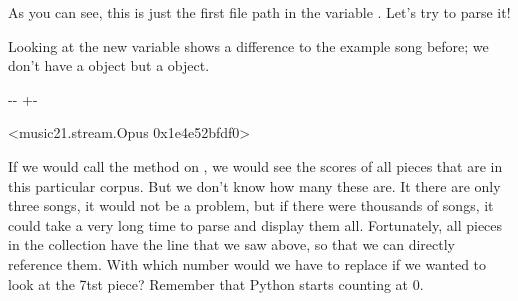 \documentclass[letterpaper,10pt,english]{sphinxmanual}
\newlength\nbsphinxcodecellspacing
\begin{document}
As you can see, this is just the first file path in the variable . Let’s try to parse it!

{
\begin{sphinxVerbatim}[commandchars=\\\{\}]
\llap{\color{nbsphinxin}[22]:\,\hspace{\fboxrule}\hspace{\fboxsep}}  \PYG{p}{[}\PYG{p}{]}
\end{sphinxVerbatim}
}

Looking at the new variable  shows a difference to the example song before; we don’t have a  object but a  object.

{
\begin{sphinxVerbatim}[commandchars=\\\{\}]
\llap{\color{nbsphinxin}[23]:\,\hspace{\fboxrule}\hspace{\fboxsep}}
\end{sphinxVerbatim}
}

{

\kern-\sphinxverbatimsmallskipamount\kern-\baselineskip
\kern+\FrameHeightAdjust\kern-\fboxrule
\vspace{\nbsphinxcodecellspacing}

\begin{sphinxVerbatim}[commandchars=\\\{\}]
\llap{\color{nbsphinxout}[23]:\,\hspace{\fboxrule}\hspace{\fboxsep}}<music21.stream.Opus 0x1e4e52bfdf0>
\end{sphinxVerbatim}
}

If we would call the  method on , we would see the scores of all pieces that are in this particular corpus. But we don’t know how many these are. It there are only three songs, it would not be a problem, but if there were thousands of songs, it could take a very long time to parse and display them all. Fortunately, all pieces in the collection have the  line that we saw above, so that we can directly reference them. With which number would we have to replace
 if we wanted to look at the 7tst piece? Remember that Python starts counting at 0.
\end{document}
